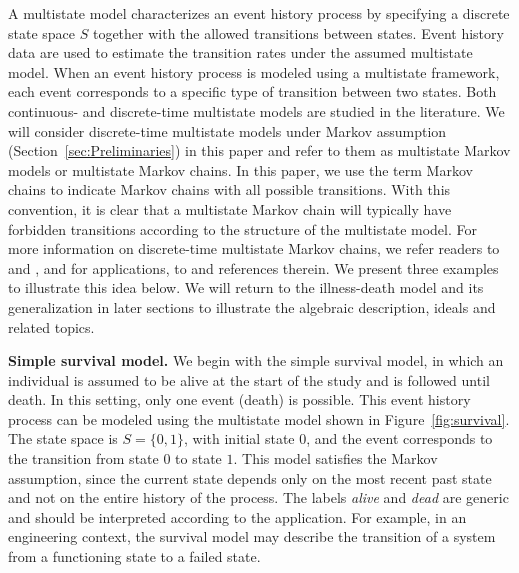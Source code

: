 \documentclass[11pt, a4paper]{article}
\numberwithin{equation}{section}
\theoremstyle{plain}
\theoremstyle{definition}
\renewcommand{\emph}[1]{\textit{#1}}
\begin{document}
A multistate model characterizes an event history process by specifying a discrete state space $S$ together with the allowed transitions between states. Event history data are used to estimate the transition rates 
under the assumed multistate model. When an event history process is modeled using a multistate framework, each event corresponds to a specific type of transition between two states. Both continuous- and discrete-time multistate models are studied in the literature. We will consider discrete-time multistate models under Markov assumption (Section~\ref{sec:Preliminaries}) in this paper and refer to them as multistate Markov models or multistate Markov chains. In this paper, we use the term Markov chains to indicate Markov chains with all possible transitions. With this convention, it is clear that a multistate Markov chain will typically have forbidden transitions according to the structure of the multistate model. For more information on  discrete-time multistate Markov chains, we refer readers to \cite[Appendix A.2]{Aalen2008} and  \cite[Section 1.3]{Cook2018}, and for applications, to \cite{BORGAN2006, Diggle2007, Dudel2020, Suresh2022} and references therein.
We present three examples to illustrate this idea below. We will return to the illness-death model and its generalization in later sections to illustrate the algebraic description, ideals and related topics.

\textbf{Simple survival model.} We begin with the simple survival model, in which an individual is assumed to be alive at the start of the study and is followed until death.
In this setting, only one event (death) is possible. This event history process can be modeled using the multistate model shown in Figure~\ref{fig:survival}. The state space is $S=\{0, 1\}$, with initial state $0$, and the event corresponds to the transition from state $0$ to state $1$. This model satisfies the Markov assumption, since the current state depends only on the most recent past state and not on the entire history of the process.  The labels \emph{alive} and \emph{dead} are generic and should be interpreted according to the application.
For example, in an engineering context, the survival model may describe the transition of a system from a functioning state to a failed state.
\end{document}
